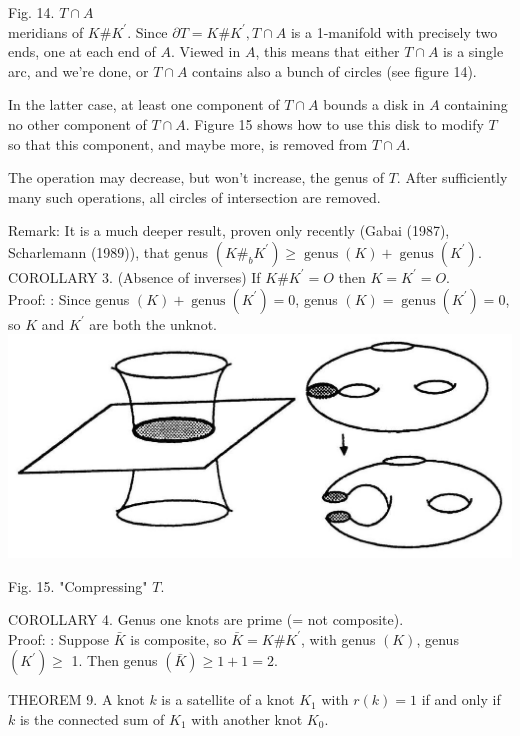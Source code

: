 \documentclass[10pt, letterpaper]{article}
\begin{document}
Fig. 14. $T \cap A$\\
meridians of $K \# K^{\prime}$. Since $\partial T=K \# K^{\prime}, T \cap A$ is a 1-manifold with precisely two ends, one at each end of $A$. Viewed in $A$, this means that either $T \cap A$ is a single arc, and we're done, or $T \cap A$ contains also a bunch of circles (see figure 14).

In the latter case, at least one component of $T \cap A$ bounds a disk in $A$ containing no other component of $T \cap A$. Figure 15 shows how to use this disk to modify $T$ so that this component, and maybe more, is removed from $T \cap A$.

The operation may decrease, but won't increase, the genus of $T$. After sufficiently many such operations, all circles of intersection are removed.

Remark: It is a much deeper result, proven only recently (Gabai (1987), Scharlemann (1989)), that genus $\left(K \#_{b} K^{\prime}\right) \geq \operatorname{genus}(K)+\operatorname{genus}\left(K^{\prime}\right)$.\\
COROLLARY 3. (Absence of inverses) If $K \# K^{\prime}=O$ then $K=K^{\prime}=O$.\\
Proof: : Since genus $(K)+\operatorname{genus}\left(K^{\prime}\right)=0$, genus $(K)=\operatorname{genus}\left(K^{\prime}\right)=0$, so $K$ and $K^{\prime}$ are both the unknot.\\
\includegraphics[scale=0.2, center]{2025_05_21_037de704f595ce642d3eg-086}

Fig. 15. "Compressing" $T$.



COROLLARY 4. Genus one knots are prime (= not composite).\\
Proof: : Suppose $\bar{K}$ is composite, so $\bar{K}=K \# K^{\prime}$, with genus $(K)$, genus $\left(K^{\prime}\right) \geq$ 1. Then genus $(\bar{K}) \geq 1+1=2$.

THEOREM 9. A knot $k$ is a satellite of a knot $K_{1}$ with $r(k)=1$ if and only if $k$ is the connected sum of $K_{1}$ with another knot $K_{0}$.
\end{document}
